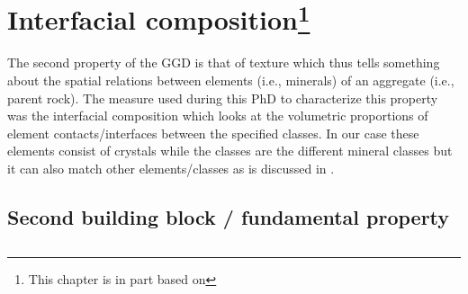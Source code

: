 \chapter[Interfacial composition]{Interfacial composition\footnote{This chapter is in part based on }}\label{ch:interfaces}
The second property of the \gls{GGD} is that of texture which thus tells something about the spatial relations between elements (i.e., minerals) of an aggregate (i.e., parent rock). %
The measure used during this PhD to characterize this property was the interfacial composition which looks at the volumetric proportions of element contacts/interfaces between the specified classes. %
In our case these elements consist of crystals while the classes are the different mineral classes but it can also match other elements/classes as is discussed in \textcite{LePera_Morrone_2020}. %



\section{Second building block / fundamental property}
\section{}




\cleardoublepage

